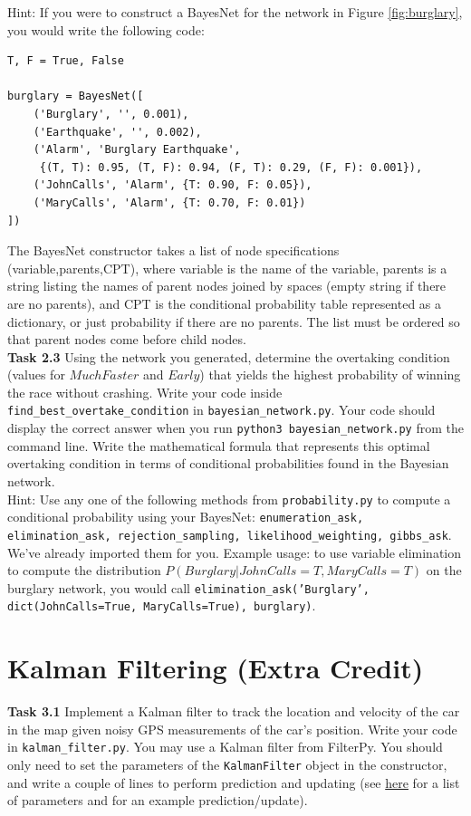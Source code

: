 \documentclass[a4paper]{article}
\begin{document}
\noindent
Hint: If you were to construct a BayesNet for the network in Figure \ref{fig:burglary}, you would write the following code:
\begin{verbatim}
T, F = True, False

burglary = BayesNet([
    ('Burglary', '', 0.001),
    ('Earthquake', '', 0.002),
    ('Alarm', 'Burglary Earthquake',
     {(T, T): 0.95, (T, F): 0.94, (F, T): 0.29, (F, F): 0.001}),
    ('JohnCalls', 'Alarm', {T: 0.90, F: 0.05}),
    ('MaryCalls', 'Alarm', {T: 0.70, F: 0.01})
])
\end{verbatim}
The BayesNet constructor takes a list of node specifications (variable,parents,CPT), where variable is the name of the variable, parents is a string listing the names of parent nodes joined by spaces (empty string if there are no parents), and CPT is the conditional probability table represented as a dictionary, or just probability if there are no parents. The list must be ordered so that parent nodes come before child nodes.\\

\noindent
\textbf{Task 2.3} Using the network you generated, determine the overtaking condition (values for $MuchFaster$ and $Early$) that yields the highest probability of winning the race without crashing. Write your code inside \texttt{find\_best\_overtake\_condition} in \texttt{bayesian\_network.py}. Your code should display the correct answer when you run \texttt{python3 bayesian\_network.py} from the command line. Write the mathematical formula that represents this optimal overtaking condition in terms of conditional probabilities found in the Bayesian network.\\

\noindent
Hint: Use any one of the following methods from \texttt{probability.py} to compute a conditional probability using your BayesNet: \texttt{enumeration\_ask, elimination\_ask, rejection\_sampling, likelihood\_weighting, gibbs\_ask}. We've already imported them for you. Example usage: to use variable elimination to compute the distribution $P(Burglary|JohnCalls=T,MaryCalls=T)$ on the burglary network, you would call \texttt{elimination\_ask('Burglary', dict(JohnCalls=True, MaryCalls=True), burglary)}.

\section{Kalman Filtering (Extra Credit)}

\noindent
\textbf{Task 3.1} Implement a Kalman filter to track the location and velocity of the car in the map given noisy GPS measurements of the car's position. Write your code in \texttt{kalman\_filter.py}. You may use a Kalman filter from FilterPy. You should only need to set the parameters of the \texttt{KalmanFilter} object in the constructor, and write a couple of lines to perform prediction and updating (see \href{https://filterpy.readthedocs.io/en/latest/kalman/KalmanFilter.html}{here} for a list of parameters and for an example prediction/update).\\
\end{document}
